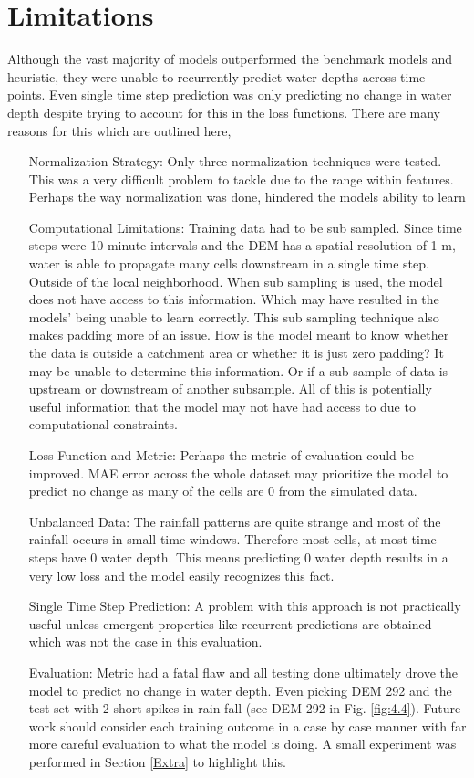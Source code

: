 \section{Limitations}
Although the vast majority of models outperformed the benchmark models and heuristic, they were unable to recurrently predict water depths across time points. Even single time step prediction was only predicting no change in water depth despite trying to account for this in the loss functions. There are many reasons for this which are outlined here,
\begin{enumerate}[align=left]
	\item[Normalization Strategy: ]  Only three normalization techniques were tested. This was a very difficult problem to tackle due to the range within features. Perhaps the way normalization was done, hindered the models ability to learn
	\item[Computational Limitations: ] Training data had to be sub sampled. Since time steps were 10 minute intervals and the DEM has a spatial resolution of 1 m, water is able to propagate many cells downstream in a single time step. Outside of the local neighborhood. When sub sampling is used, the model does not have access to this information. Which may have resulted in the models' being unable to learn correctly. This sub sampling technique also makes padding more of an issue. How is the model meant to know whether the data is outside a catchment area or whether it is just zero padding? It may be unable to determine this information. Or if a sub sample of data is upstream or downstream of another subsample. All of this is potentially useful information that the model may not have had access to due to computational constraints.
	\item[Loss Function and Metric: ] Perhaps the metric of evaluation could be improved. MAE error across the whole dataset may prioritize the model to predict no change as many of the cells are 0 from the simulated data. 
	\item[Unbalanced Data: ] The rainfall patterns are quite strange and most of the rainfall occurs in small time windows. Therefore most cells, at most time steps have 0 water depth. This means predicting 0 water depth results in a very low loss and the model easily recognizes this fact.
	\item[Single Time Step Prediction: ] A problem with this approach is not practically useful unless emergent properties like recurrent predictions are obtained which was not the case in this evaluation.
	\item[Evaluation: ] Metric had a fatal flaw and all testing done ultimately drove the model to predict no change in water depth. Even picking DEM 292 and the test set with 2 short spikes in rain fall (see DEM 292 in Fig. \ref{fig:4.4}). Future work should consider each training outcome in a case by case manner with far more careful evaluation to what the model is doing. A small experiment was performed in Section \ref{Extra} to highlight this.
\end{enumerate}


